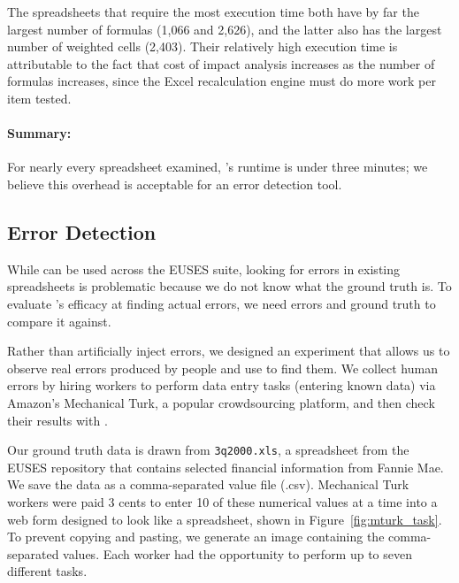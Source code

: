 The spreadsheets that require the most execution time both have by far
the largest number of formulas (1,066 and 2,626), and the latter also
has the largest number of weighted cells (2,403). Their relatively
high execution time is attributable to the fact that cost of impact
analysis increases as the number of formulas increases, since the
Excel recalculation engine must do more work per item tested.

\paragraph{Summary:} For nearly every spreadsheet
 examined, \checkcell{}'s runtime is under three minutes; we believe
 this overhead is acceptable for an error detection tool.





\subsection{Error Detection}
\label{sec:user_study}

While \checkcell{} can be used across the EUSES suite, looking for
errors in existing spreadsheets is problematic because we do not know
what the ground truth is. To evaluate \checkcell{}'s efficacy at
finding actual errors, we need errors and ground truth to compare it
against.

Rather than artificially inject errors, we designed an experiment that
allows us to observe real errors produced by people and use
\checkcell{} to find them. We collect human errors by hiring workers
to perform data entry tasks (entering known data) via Amazon's
Mechanical Turk, a popular crowdsourcing platform, and then check
their results with \checkcell{}.

Our ground truth data is drawn from \texttt{3q2000.xls}, a
spreadsheet from the EUSES repository that contains selected financial
information from Fannie Mae. We save the data as a comma-separated
value file (.csv). Mechanical Turk workers were paid 3 cents to
enter 10 of these numerical values at a time into a web form designed to look
like a spreadsheet, shown in Figure~\ref{fig:mturk_task}. To prevent
copying and pasting, we generate an image containing the
comma-separated values. Each worker had the opportunity to perform up
to seven different tasks.

